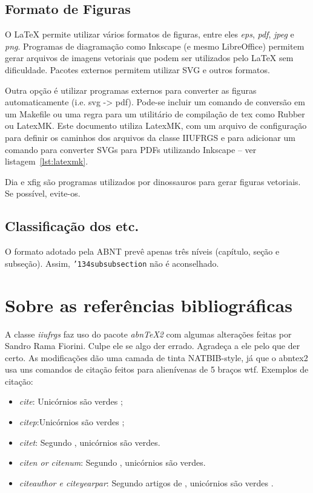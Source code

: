 \documentclass[diss,ppgc,openright,english]{iiufrgs}
\begin{document}
\subsection{Formato de Figuras}
\label{sec:fig_format}

O LaTeX permite utilizar vários formatos de figuras, entre eles \emph{eps}, \emph{pdf}, \emph{jpeg} e \emph{png}. Programas de diagramação como Inkscape (e mesmo LibreOffice) permitem gerar arquivos de imagens vetoriais que podem ser utilizados pelo LaTeX sem dificuldade. Pacotes externos permitem utilizar SVG e outros formatos.

Outra opção é utilizar programas externos para converter as figuras automaticamente (i.e. svg -> pdf). Pode-se incluir um comando de conversão em um Makefile ou uma regra para um utilitário de compilação de tex como Rubber ou LatexMK. Este documento utiliza LatexMK, com um arquivo de configuração para definir os caminhos dos arquivos da classe IIUFRGS e para adicionar um comando para converter SVGs para PDFs utilizando Inkscape -- ver listagem~\ref{lst:latexmk}.



Dia e xfig são programas utilizados por dinossauros para gerar figuras vetoriais. Se possível, evite-os.

\subsection{Classificação dos etc.}

O formato adotado pela ABNT prevê apenas três níveis (capítulo, seção e subseção). Assim, \texttt{\char'134subsubsection} não é aconselhado.

\section{Sobre as referências bibliográficas}

A classe \emph{iiufrgs} faz uso do pacote \emph{abnTeX2} com algumas alterações
feitas por Sandro Rama Fiorini. Culpe ele se algo der errado. Agradeça a ele
pelo que der certo. As modificações dão uma camada de tinta NATBIB-style,
já que o abntex2 usa uns comandos de citação feitos para alienívenas de 5 braços 
wtf. Exemplos de citação:

\begin{itemize}
    \item \emph{cite}: Unicórnios são verdes \cite{Adams2009Conceptual};
    \item \emph{citep}:Unicórnios são verdes \citep{Adams2009Conceptual};
    \item \emph{citet}: Segundo \citet{Adams2009Conceptual}, unicórnios são
                        verdes.
    \item \emph{citen or citenum}: Segundo ,
        unicórnios são verdes.
    \item \emph{citeauthor e citeyearpar}: Segundo artigos de
        \citeauthor{Adams2009Conceptual} , unicórnios são verdes 
        \citeyearpar{Adams2009Conceptual}.

\end{itemize}
\end{document}
